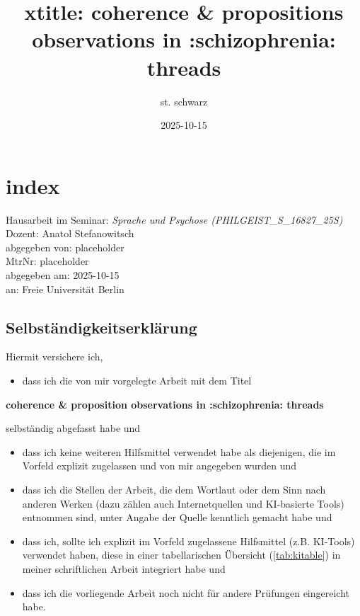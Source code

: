 \documentclass[
  12pt,
  oneside]{book}
\title{xtitle: coherence \& propositions observations in :schizophrenia: threads}
\author{st. schwarz}
\date{2025-10-15}
\providecommand{\tightlist}{%
  \setlength{\itemsep}{0pt}\setlength{\parskip}{0pt}}
\begin{document}
\maketitle

{
\setcounter{tocdepth}{1}
\tableofcontents
}
\chapter{index}\label{index}

Hausarbeit im Seminar: \emph{Sprache und Psychose (PHILGEIST\_S\_16827\_25S)}\\
Dozent: Anatol Stefanowitsch\\
abgegeben von: placeholder\\
MtrNr: placeholder\\
abgegeben am: 2025-10-15\\
an: Freie Universität Berlin

\section{Selbständigkeitserklärung}\label{selbstuxe4ndigkeitserkluxe4rung}

Hiermit versichere ich,

\begin{itemize}
\tightlist
\item
  dass ich die von mir vorgelegte Arbeit mit dem Titel
\end{itemize}

\textbf{coherence \& proposition observations in :schizophrenia: threads}

selbständig abgefasst habe und

\begin{itemize}
\tightlist
\item
  dass ich keine weiteren Hilfsmittel verwendet habe als diejenigen, die im Vorfeld explizit zugelassen und von mir angegeben wurden und
\item
  dass ich die Stellen der Arbeit, die dem Wortlaut oder dem Sinn nach anderen Werken (dazu zählen auch Internetquellen und KI-basierte Tools) entnommen sind, unter Angabe der Quelle kenntlich gemacht habe und
\item
  dass ich, sollte ich explizit im Vorfeld zugelassene Hilfsmittel (z.B. KI-Tools) verwendet haben, diese in einer tabellarischen Übersicht (\ref{tab:kitable}) in meiner schriftlichen Arbeit integriert habe und
\item
  dass ich die vorliegende Arbeit noch nicht für andere Prüfungen eingereicht habe.
\end{itemize}
\end{document}
